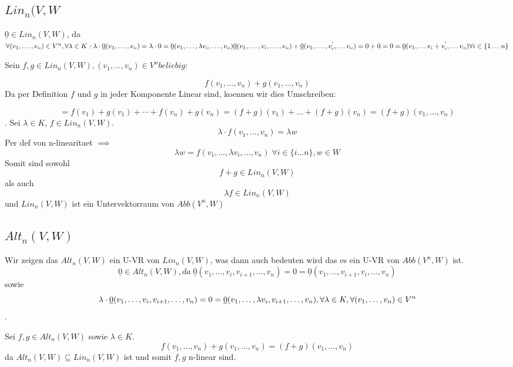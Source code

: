\documentclass{article}
\begin{document}
  \subsection{$Lin_{n}(V,W$}
  $\underline{0} \in Lin_{n}(V,W)$, da $\forall (v_{1} ,\dots, v_{n}) \in V^{n}, \forall \lambda \in K :\newline \newline  \lambda \cdot \underline{0}(v_{1},\dots ,v_{n}) = \lambda \cdot 0  = \underline{0}(v_{1},\dots, \lambda v_{i}, \dots, v_{n}) \newline \newline
  \underline{0}(v_{1} ,\dots, v_{i} ,\dots, v_{n}) + \underline{0}(v_{1}, \dots ,v_{i}^{'} ,\dots v_{n}) = 0 + 0 = 0 = \underline{0}(v_{1}, \dots v_{i}+ v_{i}^{'}, \dots v_{n}) \newline \newline \forall i \in \{1\dots n\}$

  Sein $f, g \in Lin_{n}(V,W), (v_{1} ,\dots ,v_{n}) \in V^{n} beliebig$:

  $$f(v_{1},\dots,v_{n}) + g(v_{1},\dots,v_{n})$$
  Da per Definition $f$ und $g$ in jeder Komponente Linear sind, koennen wir dies Umschreiben:

  $$ = f(v_{1}) + g(v_{1}) + \cdots + f(v_{n}) + g(v_{n}) = (f + g)(v_{1}) + \dots + (f +g)(v_{n}) = (f + g)(v_{1}, \dots , v_{n})$$.
  Sei $\lambda \in K$, $f \in Lin_{n}(V,W)$.
  $$\lambda \cdot f(v_{1}, \dots ,v_{n}) = \lambda w $$
  Per def von n-linearitaet $\implies$
  $$\lambda w = f(v_{1},\dots,\lambda v_{i},\dots, v_{n}) \;  \forall i \in \{i\dots n\}, w \in W $$
  Somit sind sowohl \[f + g \in Lin_{n}(V,W)\] als auch \[\lambda f \in Lin_{n}(V,W)\] und $Lin_{n}(V,W)$ ist ein Untervektorraum von $Abb(V^{n},W)$
  \subsection{$Alt_{n}(V,W)$}
  Wir zeigen das $Alt_{n}(V,W)$ ein U-VR von $Lin_{n}(V,W)$, was dann auch bedeuten wird das es ein U-VR von $Abb(V^{n},W)$ ist.
  $$\underline{0} \in Alt_{n}(V,W), da \; \underline{0}(v_{1}, \dots , v_{i},v_{i+1},\dots,v_{n}) = 0 = \underline{0}(v_{1}, \dots , v_{i+1},v_{i},\dots,v_{n}) $$
  sowie
  $$ \lambda \cdot \underline{0}(v_{1}, \dots , v_{i},v_{i+1},\dots,v_{n}) = 0 =  \underline{0}(v_{1}, \dots , \lambda v_{i},v_{i+1},\dots,v_{n}),
  \newline \forall \lambda \in K, \forall (v_{1},\dots, v_{n}) \in V^{n}$$.

  Sei $f, g \in Alt_{n}(V,W)$ sowie $\lambda \in K$.
  \[f(v_{1},\dots, v_{n}) + g(v_{1},\dots,v_{n}) = (f + g)(v_{1}, \dots, v_{n})  \]
  da $Alt_{n}(V,W) \subseteq Lin_{n}(V,W)$ ist und somit $f,g$ n-linear sind.
\end{document}

